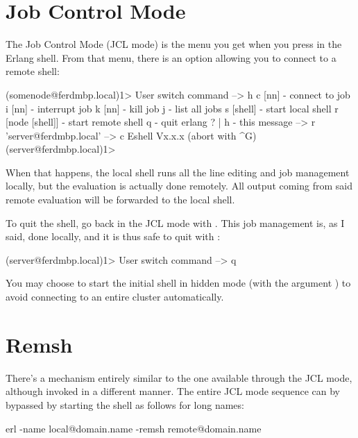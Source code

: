 \section{Job Control Mode}

The Job Control Mode (JCL mode) is the menu you get when you press  in the Erlang shell. From that menu, there is an option allowing you to connect to a remote shell:

\begin{VerbatimEshell}
(somenode@ferdmbp.local)1>
User switch command
 --> h
  c [nn]            - connect to job
  i [nn]            - interrupt job
  k [nn]            - kill job
  j                 - list all jobs
  s [shell]         - start local shell
  r [node [shell]]  - start remote shell
  q                 - quit erlang
  ? | h             - this message
 --> r 'server@ferdmbp.local'
 --> c
Eshell Vx.x.x  (abort with ^G)
(server@ferdmbp.local)1>
\end{VerbatimEshell}

When that happens, the local shell runs all the line editing and job management locally, but the evaluation is actually done remotely. All output coming from said remote evaluation will be forwarded to the local shell.

To quit the shell, go back in the JCL mode with . This job management is, as I said, done locally, and it is thus safe to quit with :

\begin{VerbatimEshell}
(server@ferdmbp.local)1>
User switch command
 --> q
\end{VerbatimEshell}

You may choose to start the initial shell in hidden mode (with the argument ) to avoid connecting to an entire cluster automatically.

\section{Remsh}

There's a mechanism entirely similar to the one available through the JCL mode, although invoked in a different manner. The entire JCL mode sequence can by bypassed by starting the shell as follows for long names:

\begin{VerbatimText}
erl -name local@domain.name -remsh remote@domain.name
\end{VerbatimText}

